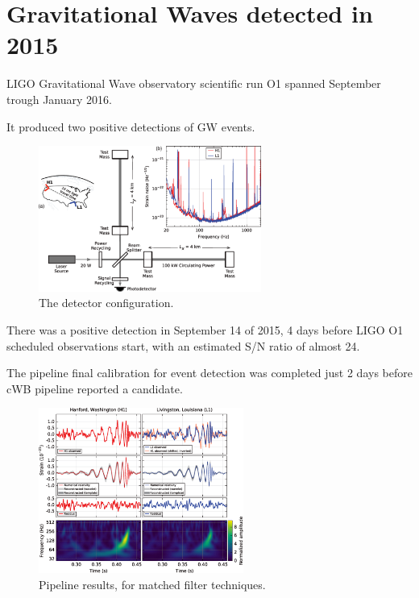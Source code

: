 \documentclass[10pt]{beamer}
\begin{document}
\section{Gravitational Waves detected in 2015}
\begin{frame}
LIGO Gravitational Wave observatory scientific run O1 
spanned September trough January 2016.

It produced two positive detections of GW events.
\begin{figure}%
 \centering
 \includegraphics[width=0.65\textwidth]{./slides/plots/medium.png}
 \caption{\scriptsize{The detector configuration. }} 
\end{figure}
\end{frame}
\begin{frame}
There was a positive detection in September 14 of 2015, 4 days
before LIGO O1 scheduled observations start, with an estimated
S/N ratio of almost 24.

The pipeline final calibration for event detection was completed 
just 2 days before cWB pipeline reported a candidate.

\begin{figure}%
 \centering
 \includegraphics[width=0.6\textwidth]{./slides/plots/medium_fp.png}
 \caption{\scriptsize{Pipeline results, for matched filter techniques.}} 
 
\end{figure}
\end{frame}
\end{document}
